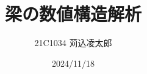 \documentclass[uplatex]{jsarticle}
\begin{document}
\title{梁の数値構造解析}
\author{21C1034 苅込凌太郎}
\date{2024/11/18}%
\maketitle







\end{document}
